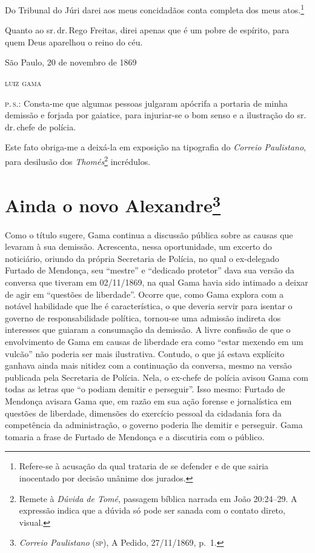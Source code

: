 Do Tribunal do Júri darei aos meus concidadãos conta completa dos meus
atos.\footnote{Refere-se à acusação da qual trataria de se defender e
  de que sairia inocentado por decisão unânime dos jurados.}

Quanto ao sr.\,dr.\,Rego Freitas, direi apenas que é um pobre de espírito,
para quem Deus aparelhou o reino do céu.

\begin{flushright}
São Paulo, 20 de novembro de 1869

\textsc{luiz gama}
\end{flushright}

\textsc{p.\,s.:} Consta-me que algumas pessoas julgaram apócrifa a portaria de
minha demissão e forjada por gaiatice, para injuriar-se o bom senso e a
ilustração do sr.\,dr.\,chefe de polícia.

Este fato obriga-me a deixá-la em exposição na tipografia do
\emph{Correio Paulistano}, para desilusão dos \emph{Thomés}\footnote{
  Remete à \emph{Dúvida de Tomé}, passagem bíblica narrada em João
  20:24--29. A expressão indica que a dúvida só pode ser sanada com o
  contato direto, visual.} incrédulos.

\chapter{Ainda o novo Alexandre\footnote{\emph{Correio Paulistano}
  (\textsc{sp}), A Pedido, 27/11/1869, p.~1.}}

\begin{didascalia}
Como o título sugere, Gama continua a discussão pública sobre as causas
que levaram à sua demissão. Acrescenta, nessa oportunidade, um excerto
do noticiário, oriundo da própria Secretaria de Polícia, no qual o
ex-delegado Furtado de Mendonça, seu ``mestre'' e ``dedicado protetor'' dava
sua versão da conversa que tiveram em 02/11/1869, na qual Gama havia
sido intimado a deixar de agir em ``questões de liberdade''. Ocorre que,
como Gama explora com a notável habilidade que lhe é característica, o
que deveria servir para isentar o governo de responsabilidade política,
tornou-se uma admissão indireta dos interesses que guiaram a consumação
da demissão. A livre confissão de que o envolvimento de Gama em causas
de liberdade era como ``estar mexendo em um vulcão'' não poderia ser mais
ilustrativa. Contudo, o que já estava explícito ganhava ainda mais
nitidez com a continuação da conversa, mesmo na versão publicada pela
Secretaria de Polícia. Nela, o ex-chefe de polícia avisou Gama com todas
as letras que ``o podiam demitir e perseguir''. Isso mesmo: Furtado de
Mendonça avisara Gama que, em razão em sua ação forense e jornalística
em questões de liberdade, dimensões do exercício pessoal da cidadania
fora da competência da administração, o governo poderia lhe demitir e
perseguir. Gama tomaria a frase de Furtado de Mendonça e a discutiria
com o público.
\end{didascalia}



